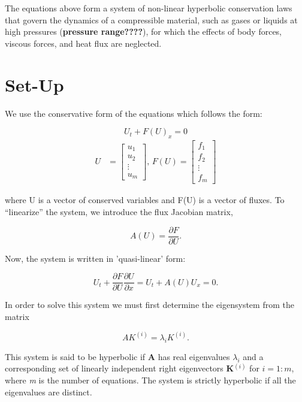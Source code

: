 \documentclass[]{article}
\begin{document}
	The equations above form a system of non-linear hyperbolic conservation laws that govern the dynamics of a compressible material, such as gases or liquids at high pressures (\textbf{pressure range????}), for which the effects of body forces, viscous forces, and heat flux are neglected. 
	
\section{Set-Up}
	We use the conservative form of the equations which follows the form:
	 
	\begin{equation}
		U_t + F(U)_x = 0
		\label{Gen_Hyp}
	\end{equation}
		\begin{align}
			U &= \begin{bmatrix}
				u_{1} \\
				u_{2} \\
				\vdots \\
				u_{m}
				\end{bmatrix} \mbox{,  } 
				F(U) = \begin{bmatrix}
				f_{1} \\
				f_{2} \\
				\vdots \\
				f_{m}
				\end{bmatrix} 
		\end{align}

	where U is a vector of conserved variables and F(U) is a vector of fluxes. To ``linearize'' the system, we introduce the flux Jacobian matrix,
	
	\begin{equation}
		A(U) = \frac{\partial F}{\partial U}.
		\label{HypSys}
	\end{equation}
	
	Now, the system is written in 'quasi-linear' form:
	
	\begin{equation}
		U_t + \frac{\partial F}{\partial U}\frac{\partial U}{\partial x} = U_t + A(U) U_x = 0.
		\label{QLHypSys}
	\end{equation}
	
	In order to solve this system we must first determine the eigensystem from the matrix
	
	\begin{equation}
		A K^{(i)} = \lambda_i K^{(i)}.
	\end{equation}
	
	This system is said to be hyperbolic if \textbf{A} has real eigenvalues $\lambda_i$ and a corresponding set of linearly independent right eigenvectors \textbf{K$^{(i)}$} for $i=1:m$, where \textit{m} is the number of equations. The system is strictly hyperbolic if all the eigenvalues are distinct.
	
\end{document}
